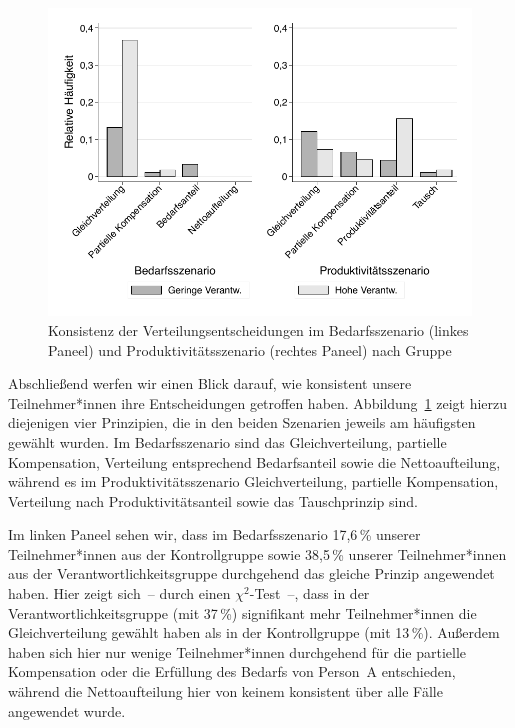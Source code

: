 \documentclass[justified,nobib,nohyper,symmetric,twoside]{tufte-book}
\begin{document}
\begin{figure}[t]\label{fig:abbildung_10}
   \center
   \caption{Konsistenz der Verteilungsentscheidungen im Bedarfsszenario (linkes Paneel)
und Produktivitätsszenario (rechtes Paneel) nach Gruppe}
   \includegraphics[width=0.99\linewidth]{figure_10.pdf}
\end{figure}

Abschließend werfen wir einen Blick darauf, wie konsistent unsere Teilnehmer*innen ihre Entscheidungen getroffen haben.
Abbildung~\ref{fig:abbildung_10} zeigt hierzu diejenigen vier Prinzipien, die in den beiden Szenarien jeweils am häufigsten gewählt wurden.
Im Bedarfsszenario sind das Gleichverteilung, partielle Kompensation, Verteilung entsprechend Bedarfsanteil sowie die Nettoaufteilung, während es im Produktivitätsszenario Gleichverteilung, partielle Kompensation, Verteilung nach Produktivitätsanteil sowie das Tauschprinzip sind.

Im linken Paneel sehen wir, dass im Bedarfsszenario 17,6\,\% unserer Teilnehmer*innen aus der Kontrollgruppe sowie 38,5\,\% unserer Teilnehmer*innen aus der Verantwortlichkeitsgruppe durchgehend das gleiche Prinzip angewendet haben.
Hier zeigt sich~-- durch einen $\chi^{\textrm{2}}$-Test~--, dass in der Verantwortlichkeitsgruppe (mit 37\,\%) signifikant mehr Teilnehmer*innen die Gleichverteilung gewählt haben als in der Kontrollgruppe (mit 13\,\%).
Außerdem haben sich hier nur wenige Teilnehmer*innen durchgehend für die partielle Kompensation oder die Erfüllung des Bedarfs von Person~A entschieden, während die Nettoaufteilung hier von keinem konsistent über alle Fälle angewendet wurde.
\end{document}
